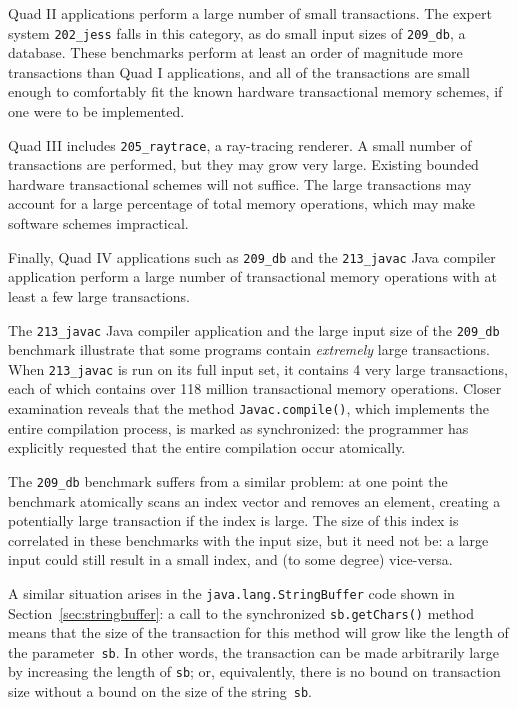 \documentclass[12pt]{article}
\newcommand{\secref}[1]         {Section~\ref{sec:#1}}
\begin{document}
Quad II applications perform a large number of small transactions.
The expert system \texttt{202\_jess} falls in this category, as do
small input sizes of \texttt{209\_db}, a database.  These benchmarks
perform at least an order of magnitude more transactions than Quad
I applications, and all of the transactions are small enough to 
comfortably fit the known hardware transactional memory schemes, if
one were to be implemented.

Quad III includes \texttt{205\_raytrace}, a ray-tracing renderer.  A
small number of transactions are performed, but they may grow very
large.  Existing bounded hardware transactional schemes will not
suffice.  The large
transactions may account for a large percentage of total memory
operations, which may make software schemes impractical.

Finally, Quad IV applications such as \texttt{209\_db} and the
\texttt{213\_javac} Java compiler application perform a large number
of transactional memory operations with at least a few large transactions.  

The \texttt{213\_javac} Java compiler application and the large input
size of the \texttt{209\_db} benchmark illustrate that some programs
contain \emph{extremely} large transactions.  When \texttt{213\_javac}
is run on its full input set, it contains 4 very large transactions,
each of which contains over 118 million transactional memory
operations.  Closer
examination reveals that the method \texttt{Javac.compile()}, which
implements the entire compilation process, is marked as synchronized:
the programmer has explicitly requested that the entire compilation
occur atomically.

The \texttt{209\_db} benchmark suffers from a similar problem: at one
point the benchmark atomically scans an index vector and removes an
element, creating a potentially large transaction if the index is
large.  The size of this index is correlated in these benchmarks with
the input size, but it need not be: a large input could still result
in a small index, and (to some degree) vice-versa.

A similar situation arises in the {\tt java.lang.StringBuffer} code
shown in \secref{stringbuffer}:  a call to the synchronized
\texttt{sb.getChars()} method means that
the size of the transaction for this method will grow like the length
of the parameter~\texttt{sb}.  In other words, the transaction can be
made arbitrarily large by increasing the length of \texttt{sb}; or,
equivalently, there is no bound on transaction size without a bound on
the size of the string~\texttt{sb}.
\end{document}
